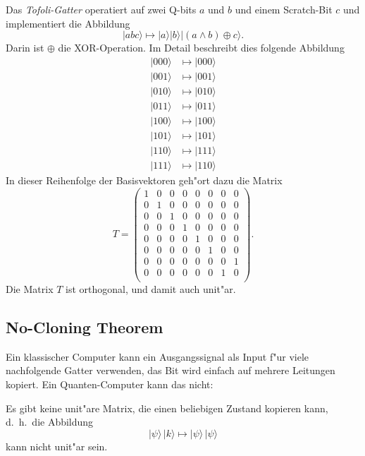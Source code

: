 \begin{beispiel}
Das {\em Tofoli-Gatter} operatiert auf zwei Q-bits $a$ und $b$ und einem
Scratch-Bit $c$ und implementiert die Abbildung
\[
|abc\rangle
\mapsto
|a\rangle|b\rangle|(a\wedge b)\oplus c\rangle.
\]
Darin ist $\oplus$ die XOR-Operation. 
Im Detail beschreibt dies folgende Abbildung
\begin{align*}
|000\rangle&\mapsto|000\rangle\\
|001\rangle&\mapsto|001\rangle\\
|010\rangle&\mapsto|010\rangle\\
|011\rangle&\mapsto|011\rangle\\
|100\rangle&\mapsto|100\rangle\\
|101\rangle&\mapsto|101\rangle\\
|110\rangle&\mapsto|111\rangle\\
|111\rangle&\mapsto|110\rangle
\end{align*}
In dieser Reihenfolge der Basisvektoren geh"ort dazu die Matrix
\[
T=
\begin{pmatrix}
1&0&0&0&0&0&0&0\\
0&1&0&0&0&0&0&0\\
0&0&1&0&0&0&0&0\\
0&0&0&1&0&0&0&0\\
0&0&0&0&1&0&0&0\\
0&0&0&0&0&1&0&0\\
0&0&0&0&0&0&0&1\\
0&0&0&0&0&0&1&0\\
\end{pmatrix}.
\]
Die Matrix $T$ ist orthogonal, und damit auch unit"ar.
\end{beispiel}

\subsection{No-Cloning Theorem}
Ein klassischer Computer kann ein Ausgangssignal als Input f"ur viele
nachfolgende Gatter verwenden, das Bit wird einfach auf mehrere Leitungen
kopiert. 
Ein Quanten-Computer kann das nicht:
\begin{satz}
\label{skript:no-cloning-theorem}
Es gibt keine unit"are Matrix, die einen beliebigen Zustand kopieren
kann, d.~h.~die Abbildung
\[
|\psi\rangle\,|k\rangle\mapsto |\psi\rangle\,|\psi\rangle
\]
kann nicht unit"ar sein.
\end{satz}


